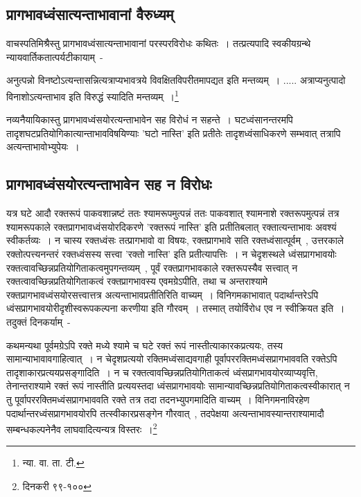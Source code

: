 		\subsection{प्रागभावध्वंसात्यन्ताभावानां वैरुध्यम्}

		वाचस्पतिमिश्रैस्तु प्रागभावध्वंसात्यन्ताभावानां परस्परविरोधः कथितः~। तत्प्रत्यपादि स्वकीयग्रन्थे न्यायवार्तिकतात्पर्यटीकायाम्~-

		{\fontsize{11.7}{0}\selectfont\s अनुत्पन्नो विनष्टोऽत्यन्तासन्नित्यत्राप्यभावत्रये विवक्षितविपरीतमापद्यत इति मन्तव्यम्~। .....  अत्राप्यनुत्पादो विनाशोऽत्यन्ताभाव इति विरुद्धं स्यादिति मन्तव्यम्~।\footnote{न्या. वा. ता. टी.}}

		नव्यनैयायिकास्तु प्रागभावध्वंसयोरत्यन्ताभावेन सह विरोधं न सहन्ते~। घटध्वंसानन्तरमपि तादृशघटप्रतियोगिकात्यान्ताभावविषयिण्याः 'घटो नास्ति' इति प्रतीतेः तादृशध्वंसाधिकरणे सम्भवात् तत्रापि अत्यन्ताभावोभ्युपेयः~।

		\subsection{प्रागभावध्वंसयोरत्यन्ताभावेन सह न विरोधः}

		यत्र घटे आदौ रक्तरूपं पाकवशान्नष्टं ततः श्यामरूपमुत्पन्नं ततः पाकवशात् श्यामनाशे रक्तरूपमुत्पन्नं तत्र श्यामरूपकाले रक्तप्रागभावध्वंसयोरदिकरणे 'रक्तरूपं नास्ति' इति प्रतीतिबलात् रक्तात्यन्ताभावः अवश्यं स्वीकर्तव्यः~। न चास्य रक्तध्वंसः तत्प्रागभावो वा विषयः, रक्तप्रागभावे सति रक्तध्वंसात्पूर्वम्~, उत्तरकाले रक्तोत्पत्त्यनन्तरं रक्तध्वंसस्य सत्त्वा 'रक्तो नास्ति' इति प्रतीत्यापत्तिः~। न चेदृशस्थले ध्वंसप्रागभावयोः रक्तत्वावच्छिन्नप्रतियोगिताकत्वमुपगन्तव्यम्~, पूर्वं रक्तप्रागभावकाले रक्तरूपस्यैव सत्त्वात् न रक्तत्वावच्छिन्नप्रतियोगिताकत्वं रक्तप्रागभावस्य एवमग्रेऽपीति, तथा च अन्तराश्यामे रक्तप्रागभावध्वंसयोरसत्त्वात्तत्र अत्यन्ताभावप्रतीतिरिति वाच्यम्~। विनिगमकाभावात् पदार्थान्तरेऽपि ध्वंसप्रागभावयोरीदृशीस्वरूपकल्पना करणीया इति गौरवम्~। तस्मात् तयोर्विरोध एव न स्वीक्रियत इति~। तदुक्तं दिनकर्याम्~-

		{\fontsize{11.7}{0}\selectfont\s कथमन्यथा पूर्वमग्रेऽपि रक्ते मध्ये श्यामे च घटे रक्तं रूपं नास्तीत्याकारकप्रत्ययः, तस्य सामान्याभावावगाहित्वात्~। न चेदृशप्रत्ययो रक्तिमध्वंसाद्यवगाही पूर्वापररक्तिमध्वंसप्रागभाववति रक्तेऽपि तादृशाकारप्रत्ययप्रसङ्गादिति~। न च रक्तत्वावच्छिन्नप्रतियोगिताकत्वं ध्वंसप्रागभावयोरव्याप्यवृत्ति, तेनान्तराश्यामे रक्तं रूपं नास्तीति प्रत्ययस्तदा ध्वंसप्रागभावयोः सामान्यावच्छिन्नप्रतियोगिताकत्वस्वीकारात् न तु पूर्वापररक्तिमध्वंसप्रागभाववति रक्ते तत्र तदा तदनभ्युपगमादिति वाच्यम्~। विनिगमनाविरहेण पदार्थान्तरध्वंसप्रागभावयोरपि तत्स्वीकारप्रसङ्गेन गौरवात्~, तदपेक्षया अत्यन्ताभावस्यान्तराश्यामादौ सम्बन्धकल्पनेनैव लाघवादित्यन्यत्र विस्तरः~।\footnote{दिनकरी ९९-१००}}


